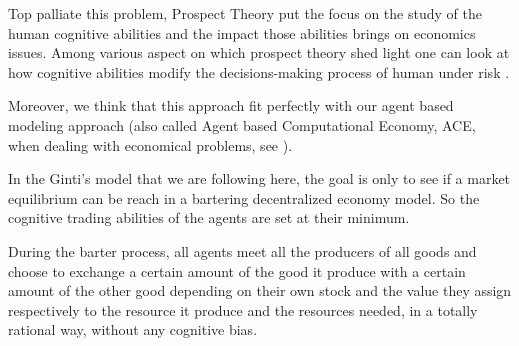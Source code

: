 \documentclass[a4paper]{article}
\begin{document}
Top palliate this problem, Prospect Theory put the focus on the study of the human cognitive abilities and the impact those abilities brings on economics issues. Among various aspect on which prospect theory shed light one can look at how cognitive abilities modify the decisions-making process of human under risk
\cite{weber_disposition_1998}.

Moreover, we think that this approach fit perfectly with our agent based modeling approach (also called Agent based Computational Economy, ACE, when dealing with economical problems, see
\cite{tesfatsion_introduction_2001}).

In the Ginti's model that we are following here, the goal is only to see if a market equilibrium can be reach in a bartering decentralized economy model. So the cognitive trading abilities of the agents are set at their minimum. 

During the barter process, all agents meet all the producers of all goods and choose to exchange a certain amount of the good it produce with a certain amount of the other good depending on their own stock and the value they assign respectively to the resource it produce and the resources needed, in a totally rational way, without any cognitive bias.


  
\end{document}
